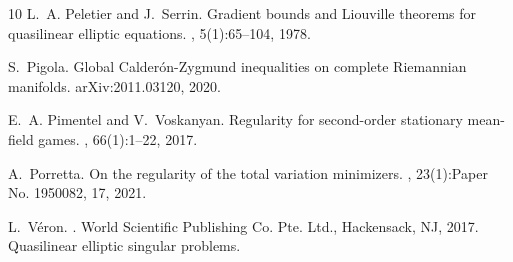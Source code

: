 \documentclass[10pt, a4paper, reqno, oneside]{amsart}
\theoremstyle{plain}
\theoremstyle{definition}
\theoremstyle{plain}
\theoremstyle{definition}
\theoremstyle{plain}
\renewcommand{\=}{:=}
\begin{document}
\begin{thebibliography}{10}
L.~A. Peletier and J.~Serrin.
\newblock Gradient bounds and {L}iouville theorems for quasilinear elliptic
  equations.
, 5(1):65--104, 1978.

S.~Pigola.
\newblock Global {C}alder\'on-{Z}ygmund inequalities on complete {R}iemannian
  manifolds.
\newblock arXiv:2011.03120, 2020.

E.~A. Pimentel and V.~Voskanyan.
\newblock Regularity for second-order stationary mean-field games.
, 66(1):1--22, 2017.

A.~Porretta.
\newblock On the regularity of the total variation minimizers.
, 23(1):Paper No. 1950082, 17, 2021.

L.~V\'{e}ron.
.
\newblock World Scientific Publishing Co. Pte. Ltd., Hackensack, NJ, 2017.
\newblock Quasilinear elliptic singular problems.

\end{thebibliography}
\end{document}
